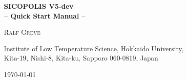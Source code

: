 \documentclass[12pt,a4paper]{article}
\begin{document}
\begin{center}

\rule{0mm}{15mm}

\begin{huge}
  \textbf{SICOPOLIS V5-dev\\[-0.5ex]
          -- Quick Start Manual --}\\[-0.5ex]
\end{huge}

\rule{0mm}{25mm}

\begin{Large}
  \textsc{Ralf Greve}
\end{Large}

\rule{0mm}{15mm}

\begin{large}
  Institute of Low Temperature Science, Hokkaido University,\\[-0.25ex]
  Kita-19, Nishi-8, Kita-ku, Sapporo 060-0819, Japan\\[1ex]
\end{large}

\vfill

\begin{large}\today\end{large}

\end{center}

\rule{0mm}{20mm}

\clearpage

\rule{0mm}{0mm}

\vfill
\end{document}
